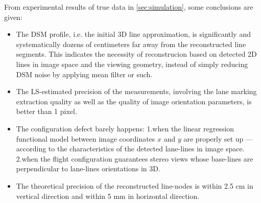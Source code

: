 From experimental results of true data in \cref{sec:simulation}, some conclusions are given:
\begin{itemize}
	\item The DSM profile, i.e. the initial 3D line approximation, is significantly and systematically dozens of centimeters far away from the reconstructed line segments. This indicates the necessity of reconstrucion based on detected 2D lines in image space and the viewing geometry, instead of simply reducing DSM noise by applying mean filter or such.
	
	\item The LS-estimated precision of the measurements, involving the lane marking extraction quality as well as the quality of image orientation parameters, is better than 1 pixel.

	\item The configuration defect %
	barely happens: 1.when the linear regression functional model between image coordinates $x$ and $y$ are properly set up ---according to the characteristics of the detected lane-lines in image space. 2.when the flight configuration guarantees stereo views whose base-lines are perpendicular to lane-lines orientations in 3D.
	
	\item The theoretical precision of the reconstructed line-nodes is within 2.5 cm in vertical direction and within 5 mm in horizontal direction.
	
\end{itemize}



